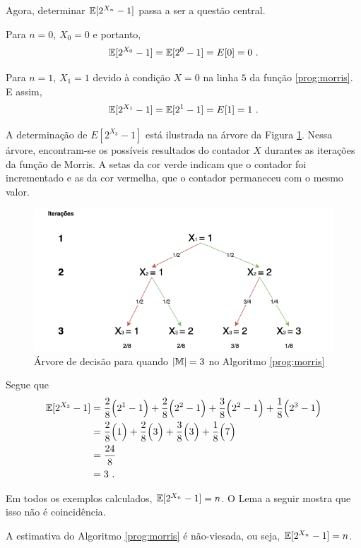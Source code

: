 Agora, determinar $\mathbb{E}[2^{X_n} - 1]$ passa a ser a questão central.

Para $n = 0$, $X_0 = 0$ e portanto,
\[ \mathbb{E}[2^{X_0} - 1] = \mathbb{E}[2^0 - 1] = E[0] = 0 \ .\]

Para $n = 1$, $X_1 = 1$ devido à condição $X = 0$ na linha $5$ da função \ref{prog:morris}. E assim, 
\[ \Ebb[2^{X_1} - 1] = \Ebb[2^1 - 1] = E[1] = 1 \ .\]

A determinação de $E[2^{X_3} - 1]$ está ilustrada na árvore da Figura \ref{fig:morris-tree}.
Nessa árvore, encontram-se os possíveis resultados do contador $X$ durantes as iterações da função de Morris.
A setas da cor verde indicam que o contador foi incrementado e as da cor vermelha, que o contador permaneceu com o mesmo valor.

\begin{figure}
  \centering
  \includegraphics[scale=0.50]{figuras/morris-tree.png}
	\caption{Árvore de decisão para quando $|\mathbb{M}| = 3$ no Algoritmo \ref{prog:morris}}\label{fig:morris-tree}
\end{figure}

Segue que
\begin{align*}
  \mathbb{E}[2^{X_3} - 1] 
    &= \frac{2}{8} \Big(2^1 - 1\Big) + \frac{2}{8} \Big(2^2 - 1\Big) + \frac{3}{8}\Big(2^2 - 1\Big) + \frac{1}{8} \Big(2^3 - 1\Big) \\
    &= \frac{2}{8} \Big(1\Big) + \frac{2}{8} \Big(3\Big) + \frac{3}{8} \Big(3\Big) + \frac{1}{8} \Big(7\Big) \\
    &= \frac{24}{8} \\
    &= 3 \ .
\end{align*}

Em todos os exemplos calculados, $\mathbb{E}[2^{X_n} - 1] = n$. O Lema a seguir mostra que isso não é coincidência.


\begin{lemma} \label{morris:expected_value}
A estimativa do Algoritmo \ref{prog:morris} é não-viesada, ou seja, $\mathbb{E}[2^{X_n} - 1] = n$.
\end{lemma}

